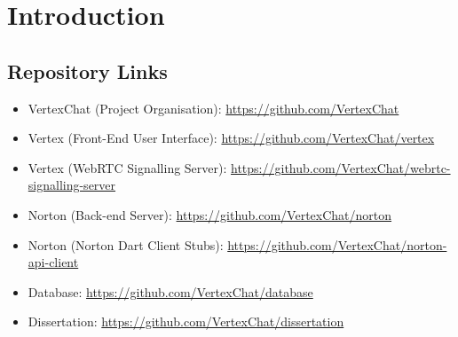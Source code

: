 \chapter{Introduction}
\section{Repository Links}
\begin{itemize}
    \item VertexChat (Project Organisation): \url{https://github.com/VertexChat}
	\item Vertex (Front-End User Interface): \url{https://github.com/VertexChat/vertex}
	\item Vertex (WebRTC Signalling Server): \url{https://github.com/VertexChat/webrtc-signalling-server}
	\item Norton (Back-end Server): \url{https://github.com/VertexChat/norton}
	\item Norton (Norton Dart Client Stubs): \url{https://github.com/VertexChat/norton-api-client}
	\item Database: \url{https://github.com/VertexChat/database}
	\item Dissertation: \url{https://github.com/VertexChat/dissertation}
\end{itemize}
